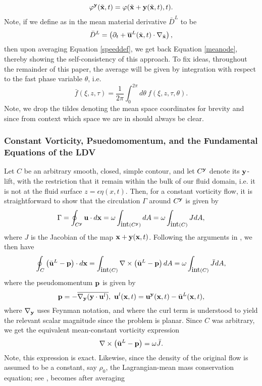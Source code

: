 \documentclass{JFM_Style/jfm}
\newcommand{\pd}{\partial}
\begin{document}
\[
\varphi^{\bf y}(\tilde{{\bf x}},t) = \varphi(\tilde{{\bf x}}+{\bf y}(\tilde{\bf x},t),t).
\]
Note, if we define as in \cite{andrews} the mean material derivative $\bar{D}^{L}$ to be
\[
\bar{D}^{L} = \left(\pd_{t} + \overline{{\bf u}}^{L}(\tilde{{\bf x}},t)\cdot \nabla_{\tilde{{\bf x}}} \right),
\]
then upon averaging Equation \eqref{speeddef}, we get back Equation \eqref{meanode}, thereby showing the self-consistency of this approach.  To fix ideas, throughout the remainder of this paper, the average will be given by integration with respect to the fast phase variable $\theta$, i.e.
\[
\bar{f}(\xi,z,\tau) = \frac{1}{2\pi}\int_{0}^{2\pi} d\theta~ f(\xi,z,\tau,\theta).
\]
Note, we drop the tildes denoting the mean space coordinates for brevity and since from context which space we are in should always be clear.

\subsubsection*{Constant Vorticity, Psuedomomentum, and the Fundamental Equations of the LDV}
Let $C$ be an arbitrary smooth, closed, simple contour, and let $C^{{\bf y}}$ denote its ${\bf y}$-lift, with the restriction that it remain within the bulk of our fluid domain, i.e. it is not at the fluid surface $z=\epsilon \eta(x,t)$.  Then, for a constant vorticity flow, it is straightforward to show that the circulation $\Gamma$ around $C^{{\bf y}}$ is given by
\[
\Gamma = \oint_{C^{{\bf y}}} {\bf u}\cdot d{\bf x} = \omega \int_{\mbox{int}(C^{{\bf y}})}dA = \omega \int_{ \mbox{int}(C)} J dA,
\]
where $J$ is the Jacobian of the map ${\bf x} + {\bf y}({\bf x},t)$.   Following the arguments in \cite{buhler}, we then have
\[
\oint_{C} \left(\bar{{\bf u}}^{L} - {\bf p} \right)\cdot d{\bf x} = \int_{\mbox{int}(C)} \nabla \times \left(\bar{{\bf u}}^{L} - {\bf p} \right)dA = \omega \int_{ \mbox{int}(C)} \bar{J} dA,
\]
where the pseudomomentum ${\bf p}$ is given by
\[
{\bf p} = -\overline{\nabla_{{\bf y}}({\bf y}\cdot {\bf u}^{l})}, ~{\bf u}^{l}({\bf x},t) = {\bf u}^{\bf y}({\bf x},t) - \bar{{\bf u}}^{L}({\bf x},t),
\]
where $\nabla_{{\bf y}}$ uses Feynman notation, and where the curl term is understood to yield the relevant scalar magnitude since the problem is planar.  Since $C$ was arbitrary, we get the equivalent mean-constant vorticity expression
\begin{equation}
\nabla \times \left(\bar{{\bf u}}^{L} - {\bf p} \right) = \omega \bar{J}.
\label{curleq}
\end{equation}
Note, this expression is exact.  Likewise, since the density of the original flow is assumed to be a constant, say $\rho_{0}$, the Lagrangian-mean mass conservation equation; see \cite{andrews,buhler}, becomes after averaging
\end{document}
